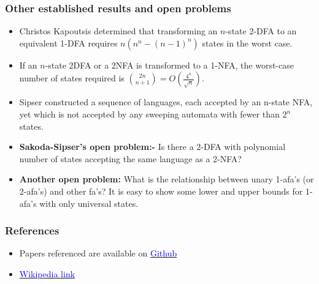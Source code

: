 \documentclass{beamer}
\begin{document}
\begin{frame}
    \frametitle{Other established results and open problems}
    \begin{itemize}
        \item Christos Kapoutsis determined that transforming an $n$-state 2-DFA to an equivalent 1-DFA requires $ {\displaystyle n(n^{n}-(n-1)^{n})}$ states in the worst case.
        \item If an $n$-state 2DFA or a 2NFA is transformed to a 1-NFA, the worst-case number of states required is $ {2n \choose n+1}= O ( \frac{4 ^n}{ \sqrt{n}} ) $.
        \item Sipser constructed a sequence of languages, each accepted by an n-state NFA, yet which is not accepted by any sweeping automata with fewer than $ {\displaystyle 2^{n}}$ states. 
        \item \textbf{Sakoda-Sipser's open problem:-} Is there a 2-DFA with polynomial number of states accepting the same language as a 2-NFA?  
        \item \textbf{Another open problem:} What is the relationship between unary 1-afa's (or 2-afa's) and other fa's? It
        is easy to show some lower and upper bounds for 1-afa's with only universal states.
    \end{itemize}
\end{frame}
\begin{frame}
    \frametitle{References}
    \begin{itemize}
       \item Papers referenced are available on  \href{https://github.com/blackscreen-whitetext/Automata_Seminar}{\textcolor{blue}{Github}}
       \item \href{https://en.wikipedia.org/wiki/Two-way_finite_automaton}{\textcolor{blue}{Wikipedia link}}
    \end{itemize}
\end{frame}
\end{document}
